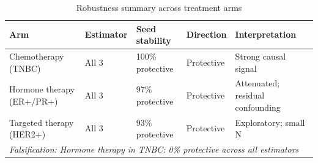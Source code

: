 \begin{table}[htbp]
\centering
\caption{Robustness summary across treatment arms}
\label{tab:robustness}
\begin{tabular}{lllll}
\toprule
Arm & Estimator & Seed stability & Direction & Interpretation \\
\midrule
Chemotherapy (TNBC)      & All 3      & 100\% protective & Protective & Strong causal signal \\
Hormone therapy (ER+/PR+) & All 3     & 97\% protective  & Protective & Attenuated; residual confounding \\
Targeted therapy (HER2+) & All 3      & 93\% protective  & Protective & Exploratory; small N \\
\midrule
\multicolumn{5}{l}{\textit{Falsification: Hormone therapy in TNBC: 0\% protective across all estimators}} \\
\bottomrule
\end{tabular}
\end{table}